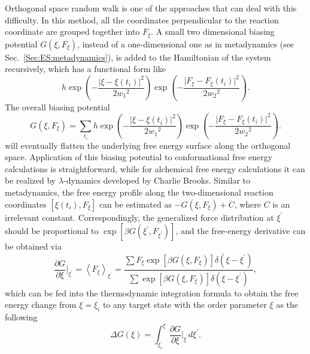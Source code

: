 Orthogonal space random walk is one of the approaches that can deal with this difficulty. In this method, all the coordinates perpendicular to the reaction coordinate are grouped together into $F_{\xi}$. A small two dimensional biasing potential $G(\xi,F_{\xi})$, instead of a one-dimensional one as in metadynamics (see Sec.~\ref{Sec:ES:metadynamics}), is added to the Hamiltonian of the system recursively, which has a functional form like
\begin{equation}
   h\exp{\left(-\frac{\lvert\xi-\xi(t_i)\rvert^2}{2{w_1}^2}\right)}\exp{\left(-\frac{\lvert F_{\xi}-F_{\xi}(t_i)\rvert^2}{2{w_2}^2}\right)}.
\end{equation}
The overall biasing potential
\begin{equation}
G(\xi,F_\xi)=\sum\limits_{t_i}h\exp{\left(-\frac{\lvert\xi-\xi(t_i)\rvert^2}{2{w_1}^2}\right)}\exp{\left(-\frac{\lvert F_{\xi}-F_{\xi}(t_i)\rvert^2}{2{w_2}^2}\right)}.
\end{equation}
will eventually flatten the underlying free energy surface along the orthogonal space.
Application of this biasing potential to conformational free energy calculations is straightforward, while for alchemical free energy calculations it can be realized by $\lambda$-dynamics developed by Charlie Brooks.\cite{KongJCP1996} Similar to metadynamics, the free energy profile along the two-dimensional reaction coordinates $\left[\xi(t_i), F_\xi\right]$ can be estimated as $-G\left(\xi,F_{\xi}\right)+C$, where $C$ is an irrelevant constant. Correspondingly, the generalized force distribution at $\xi^\prime$ should be proportional to $\exp{\left[\beta G\left(\xi^\prime,F_{\xi^\prime}\right)\right]}$, and the free-energy derivative can be obtained via
\begin{equation}
	\frac{\partial G}{\partial \xi}\bigg\rvert_{\xi^\prime}=\left<F_\xi\right>_{\xi^\prime}=\frac{\sum F_\xi\exp{\left[\beta G(\xi,F_\xi)\right]}\delta(\xi-\xi^\prime)}{\sum\exp{\left[\beta G(\xi,F_\xi)\right]}\delta(\xi-\xi^\prime)},
\end{equation}
which can be fed into the thermodynamic integration formula to obtain the free energy change from $\xi=\xi_i$ to any target state with the order parameter $\xi$ as the following
\begin{equation}
	\Delta G(\xi) = \int_{\xi_i}^{\xi}\frac{\partial G}{\partial \xi}\bigg\rvert_{\xi^\prime}d\xi^\prime.
\end{equation}